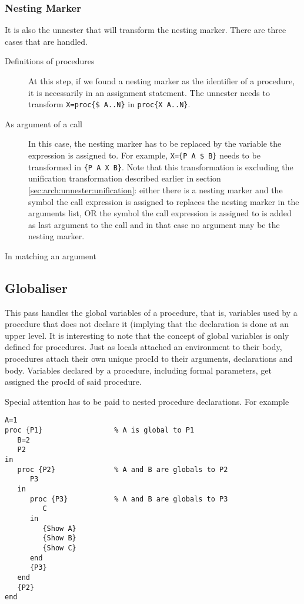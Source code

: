 \documentclass[a4paper]{memoir}
\begin{document}
\subsubsection{Nesting Marker}\label{sec:unnester:nestingmarker}
It is also the unnester that will transform the nesting marker. There are three cases that are handled.
\begin{description}
  \item[Definitions of procedures] At this step, if we found a nesting marker as the identifier of a procedure, it is necessarily in an assignment statement. The unnester needs to transform \lstinline!X=proc{$ A..N}! in \lstinline!proc{X A..N}!.
  \item[As argument of a call] In this case, the nesting marker has to be replaced by the variable the expression is assigned to. For example, \lstinline!X={P A $ B}! needs to be transformed in  \lstinline!{P A X B}!. Note that this transformation is excluding the unification transformation described earlier in section \ref{sec:arch:unnester:unification}: either there is a nesting marker and the symbol the call expression is assigned to replaces the nesting marker in the arguments list, OR the symbol the call expression is assigned to is added as last argument to the call and in that case no argument may be the nesting marker.
  \item[In matching an argument] %
\end{description}

\subsection{Globaliser}\label{sec:arch:globaliser}            
This pass handles the global variables of a procedure, that is, variables used by a procedure that does not declare it (implying that the declaration is done at an upper level. It is interesting to note that the concept of global variables is only defined for procedures.
Just as locals attached an environment to their body, procedures attach their own unique procId to their arguments, declarations and body.
Variables declared by a procedure, including formal parameters, get assigned the procId of said procedure.

Special attention has to be paid to nested procedure declarations. For example
\begin{lstlisting}
A=1
proc {P1}                 % A is global to P1
   B=2
   P2
in
   proc {P2}              % A and B are globals to P2
      P3 
   in
      proc {P3}           % A and B are globals to P3
         C
      in
         {Show A}
         {Show B}
         {Show C}
      end
      {P3}
   end
   {P2}
end
\end{lstlisting}
\end{document}
